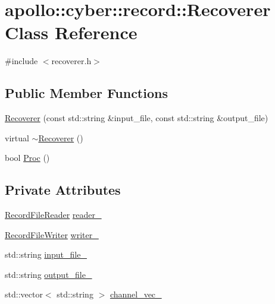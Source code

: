 \hypertarget{classapollo_1_1cyber_1_1record_1_1Recoverer}{\section{apollo\-:\-:cyber\-:\-:record\-:\-:Recoverer Class Reference}
\label{classapollo_1_1cyber_1_1record_1_1Recoverer}
}


{\ttfamily \#include $<$recoverer.\-h$>$}

\subsection*{Public Member Functions}
\begin{DoxyCompactItemize}
\item 
\hyperlink{classapollo_1_1cyber_1_1record_1_1Recoverer_a3d8661d9af777592105a63e052f3a1cc}{Recoverer} (const std\-::string \&input\-\_\-file, const std\-::string \&output\-\_\-file)
\item 
virtual \hyperlink{classapollo_1_1cyber_1_1record_1_1Recoverer_ac3bd9891fdbdf130c5f0940e7f007548}{$\sim$\-Recoverer} ()
\item 
bool \hyperlink{classapollo_1_1cyber_1_1record_1_1Recoverer_aae19866e97310ba61841d9c30748d64f}{Proc} ()
\end{DoxyCompactItemize}
\subsection*{Private Attributes}
\begin{DoxyCompactItemize}
\item 
\hyperlink{classapollo_1_1cyber_1_1record_1_1RecordFileReader}{Record\-File\-Reader} \hyperlink{classapollo_1_1cyber_1_1record_1_1Recoverer_a6e741609c168bc243ca824cf343e111c}{reader\-\_\-}
\item 
\hyperlink{classapollo_1_1cyber_1_1record_1_1RecordFileWriter}{Record\-File\-Writer} \hyperlink{classapollo_1_1cyber_1_1record_1_1Recoverer_ac82563baff08a6e71cd4f9ad1da32c02}{writer\-\_\-}
\item 
std\-::string \hyperlink{classapollo_1_1cyber_1_1record_1_1Recoverer_a34d00bdab0450e4043f2dceb70031a20}{input\-\_\-file\-\_\-}
\item 
std\-::string \hyperlink{classapollo_1_1cyber_1_1record_1_1Recoverer_ada4be3a205f0669d15d6f10eb9273161}{output\-\_\-file\-\_\-}
\item 
std\-::vector$<$ std\-::string $>$ \hyperlink{classapollo_1_1cyber_1_1record_1_1Recoverer_affed4ba5586b0b0e7a23a8cd1feae15b}{channel\-\_\-vec\-\_\-}
\end{DoxyCompactItemize}


